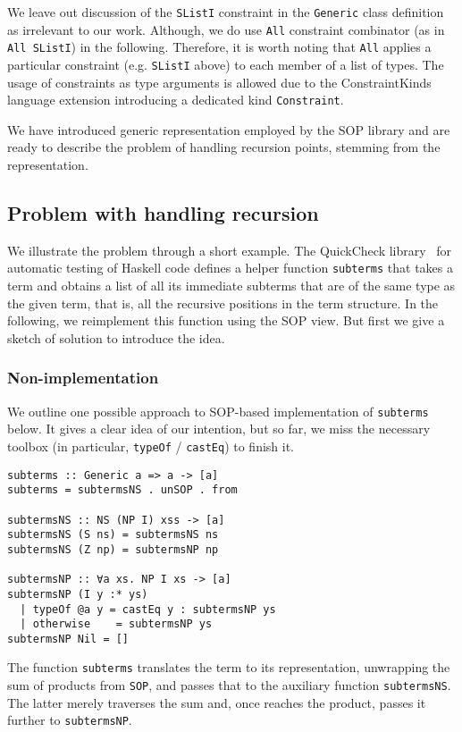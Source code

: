 \documentclass[runningheads]{llncs}
\newcommand{\K}[1]{\lstinline[style=fancy]{#1}}
\begin{document}
We leave out discussion of the \K{SListI} constraint in the \K{Generic} class definition as irrelevant to our work. Although, we do use \K{All} constraint combinator (as in \K{All SListI}) in the following. Therefore, it is worth noting that \K{All} applies a particular constraint (e.g. \K{SListI} above) to each member of a list of types. The usage of constraints as type arguments is allowed due to the \textsf{ConstraintKinds} language extension introducing a dedicated kind \K{Constraint}.

We have introduced generic representation employed by the SOP library and are ready to describe the problem of handling recursion points, stemming from the representation. 

\subsection{Problem with handling recursion}
\label{subsec:recursion-problem}

We illustrate the problem through a short example. The \textsf{QuickCheck} library~\cite{Claessen2011} for automatic testing of Haskell code defines a helper function \K{subterms} that takes a term and obtains a list of all its immediate subterms that are of the same type as the given term, that is, all the recursive positions in the term structure. In the following, we reimplement this function using the SOP view. But first we give a sketch of solution to introduce the idea.

\subsubsection{Non-implementation}

We outline one possible approach to SOP-based implementation of \K{subterms} below. It gives a clear idea of our intention, but so far, we miss the necessary toolbox (in particular, \K{typeOf} / \K{castEq}) to finish it.
\begin{lstlisting}[style=fancy]
subterms :: Generic a => a -> [a]
subterms = subtermsNS . unSOP . from

subtermsNS :: NS (NP I) xss -> [a]
subtermsNS (S ns) = subtermsNS ns
subtermsNS (Z np) = subtermsNP np

subtermsNP :: ∀a xs. NP I xs -> [a]
subtermsNP (I y :* ys)
  | typeOf @a y = castEq y : subtermsNP ys
  | otherwise    = subtermsNP ys
subtermsNP Nil = []
\end{lstlisting}
The function \K{subterms} translates the term to its representation, unwrapping the sum of products from \K{SOP}, and passes that to the auxiliary function \K{subtermsNS}. The latter merely traverses the sum and, once reaches the product,  passes it further to \K{subtermsNP}.
\end{document}
